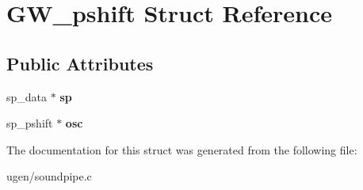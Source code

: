 \hypertarget{structGW__pshift}{}\section{G\+W\+\_\+pshift Struct Reference}
\label{structGW__pshift}
\subsection*{Public Attributes}
\begin{DoxyCompactItemize}
\item 
\hypertarget{structGW__pshift_a65461568442df9754785c34126ce8bdf}{}\label{structGW__pshift_a65461568442df9754785c34126ce8bdf} 
sp\+\_\+data $\ast$ {\bfseries sp}
\item 
\hypertarget{structGW__pshift_ab68d20ddf70e856f37cfeb8b27fa801b}{}\label{structGW__pshift_ab68d20ddf70e856f37cfeb8b27fa801b} 
sp\+\_\+pshift $\ast$ {\bfseries osc}
\end{DoxyCompactItemize}


The documentation for this struct was generated from the following file\+:\begin{DoxyCompactItemize}
\item 
ugen/soundpipe.\+c\end{DoxyCompactItemize}
